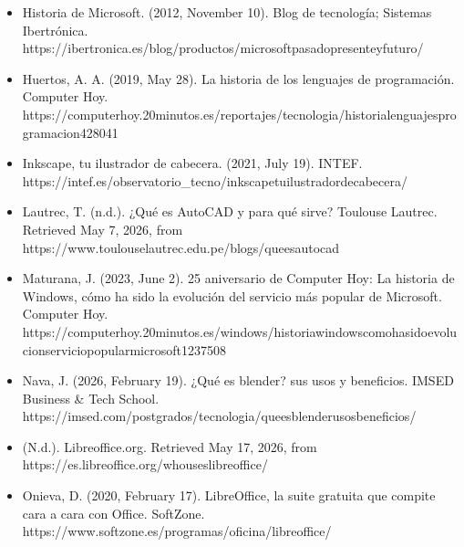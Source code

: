 \documentclass[letterpaper,10pt,spanish]{sphinxmanual}
\begin{document}
\begin{itemize}
\item {} 
\sphinxAtStartPar
Historia de Microsoft. (2012, November 10). Blog de tecnología; Sistemas Ibertrónica. https://ibertronica.es/blog/productos/microsoft\sphinxhyphen{}pasado\sphinxhyphen{}presente\sphinxhyphen{}y\sphinxhyphen{}futuro/

\item {} 
\sphinxAtStartPar
Huertos, A. A. (2019, May 28). La historia de los lenguajes de programación. Computer Hoy. https://computerhoy.20minutos.es/reportajes/tecnologia/historia\sphinxhyphen{}lenguajes\sphinxhyphen{}programacion\sphinxhyphen{}428041

\item {} 
\sphinxAtStartPar
Inkscape, tu ilustrador de cabecera. (2021, July 19). INTEF. https://intef.es/observatorio\_tecno/inkscape\sphinxhyphen{}tu\sphinxhyphen{}ilustrador\sphinxhyphen{}de\sphinxhyphen{}cabecera/

\item {} 
\sphinxAtStartPar
Lautrec, T. (n.d.). ¿Qué es AutoCAD y para qué sirve? Toulouse Lautrec. Retrieved May 7, 2026, from https://www.toulouselautrec.edu.pe/blogs/que\sphinxhyphen{}es\sphinxhyphen{}autocad

\item {} 
\sphinxAtStartPar
Maturana, J. (2023, June 2). 25 aniversario de Computer Hoy: La historia de Windows, cómo ha sido la evolución del servicio más popular de Microsoft. Computer Hoy. https://computerhoy.20minutos.es/windows/historia\sphinxhyphen{}windows\sphinxhyphen{}como\sphinxhyphen{}ha\sphinxhyphen{}sido\sphinxhyphen{}evolucion\sphinxhyphen{}servicio\sphinxhyphen{}popular\sphinxhyphen{}microsoft\sphinxhyphen{}1237508

\item {} 
\sphinxAtStartPar
Nava, J. (2026, February 19). ¿Qué es blender? sus usos y beneficios. IMSED Business \& Tech School. https://imsed.com/postgrados/tecnologia/que\sphinxhyphen{}es\sphinxhyphen{}blender\sphinxhyphen{}usos\sphinxhyphen{}beneficios/

\item {} 
\sphinxAtStartPar
(N.d.). Libreoffice.org. Retrieved May 17, 2026, from https://es.libreoffice.org/who\sphinxhyphen{}uses\sphinxhyphen{}libreoffice/

\item {} 
\sphinxAtStartPar
Onieva, D. (2020, February 17). LibreOffice, la suite gratuita que compite cara a cara con Office. SoftZone. https://www.softzone.es/programas/oficina/libreoffice/


\end{itemize}
\end{document}
